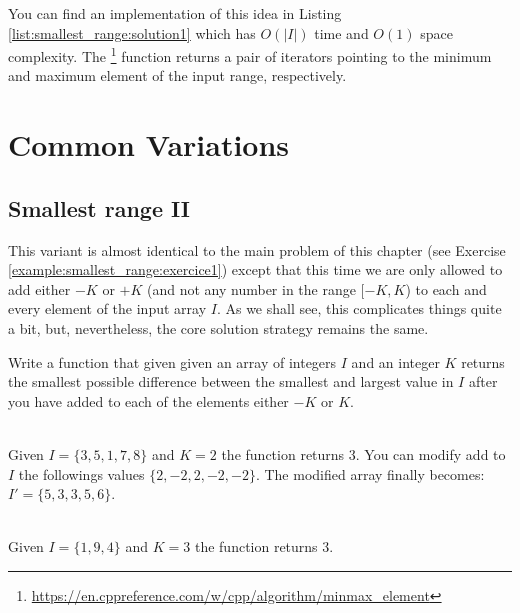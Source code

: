 You can find an implementation of this idea in Listing \ref{list:smallest_range:solution1} which has
$O(|I|)$ time and $O(1)$ space complexity. The
\footnote{\url{https://en.cppreference.com/w/cpp/algorithm/minmax_element}}
function  returns a pair of iterators pointing to the minimum and maximum element of the input
range, respectively.



\section{Common Variations}
\subsection{Smallest range \RN{2} } This variant is almost identical to the main problem of this
chapter (see Exercise \ref{example:smallest_range:exercice1}) except that this time we are only
allowed to add either $-K$ or $+K$ (and not any number in the range $[-K,K$) to each and every
element of the input array $I$. As we shall see, this complicates things quite a bit, but,
nevertheless, the core solution strategy remains the same. 

\begin{exercise}
	\label{example:smallest_range:variation1:exercice1}
	Write a function that given given an array of integers $I$ and an integer $K$ returns the
	smallest possible difference between the smallest and largest value in $I$ after you have added
	to each of the elements either $-K$ or $K$.
	
		\begin{example}
			\label{example:smallest_range:variation1:example1}
			\hfill \\
			Given $I = \{3,5,1,7,8\}$ and $K=2$ the function returns $3$. You can modify add to
			$I$ the followings values $\{2,-2,2,-2,-2\}$. The modified array finally becomes:
			$I'=\{5,3,3,5,6\}$. 
		\end{example}
	
		\begin{example}
			\label{example:smallest_range:variation1:example2}
			\hfill \\
			Given $I = \{1,9,4\}$ and $K=3$ the function returns $3$.
		\end{example}
	
	\end{exercise}

